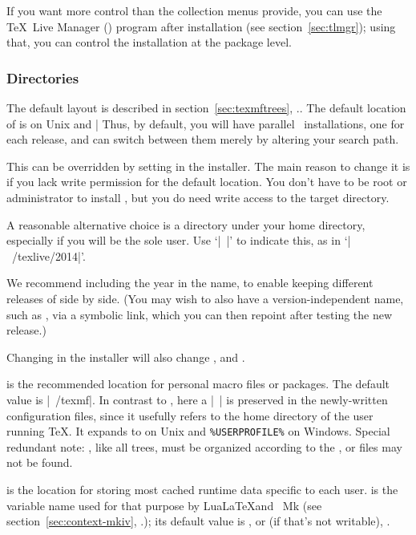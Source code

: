 \documentclass{article}
\begin{document}
If you want more control than the collection menus provide, you can use
the \TeX\ Live Manager () program after installation (see
section~\ref{sec:tlmgr}); using that, you can control the installation
at the package level.

\subsubsection{Directories}
\label{sec:directories}

The default layout is described in section~\ref{sec:texmftrees},
\p.\pageref{sec:texmftrees}. The default location of
 is  on Unix
and |%
Thus, by default, you will have parallel \TL\ installations, one for
each release, and can switch between them merely by altering your
search path.

This can be overridden by setting  in the installer.
The main reason to change it is if you lack write permission for the
default location. You don't have to be root or administrator to install
\TL, but you do need write access to the target directory.

A reasonable alternative choice is a directory under your home directory,
especially if you will be the sole user. Use
`|~|' to indicate this, as in `|~/texlive/2014|'.

We recommend including the year in the name, to enable keeping different
releases of \TL{} side by side.  (You may wish to also have a
version-independent name, such as , via a
symbolic link, which you can then repoint after testing the new release.)

Changing  in the installer will also change
,  and
.

 is the recommended location for personal macro files
or packages.  The default value is |~/texmf|.  In contrast to
, here a |~| is preserved in the newly-written
configuration files, since it usefully refers to the home directory of
the user running \TeX.  It expands to  on Unix and
\verb|%USERPROFILE%| on Windows.  Special redundant note:
, like all trees, must be organized according to the
\TDS, or files may not be found.

 is the location for storing most cached runtime data
specific to each user.   is the variable name used
for that purpose by Lua\LaTeX and \ConTeXt\ Mk (see
section~\ref{sec:context-mkiv}, \p.\pageref{sec:context-mkiv}); its
default value is , or (if that's not writable),
.
\end{document}
